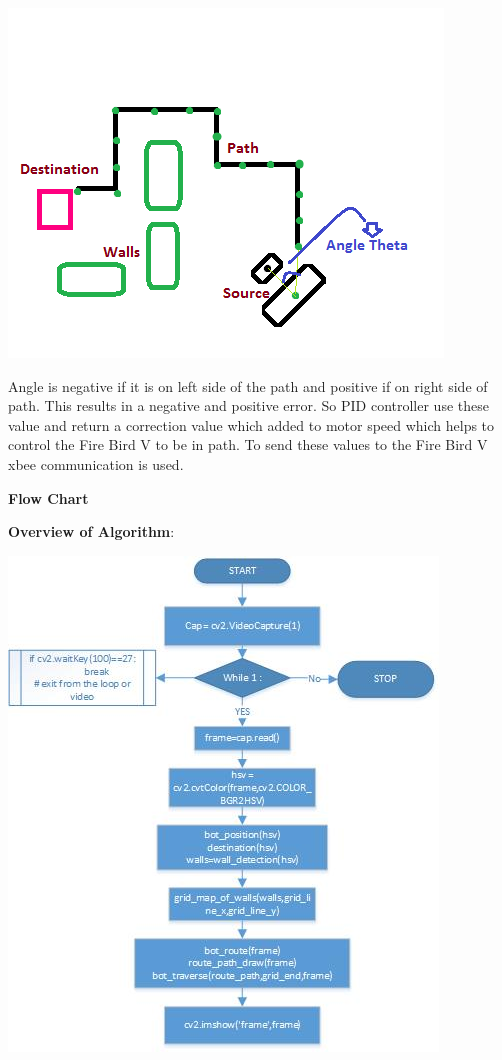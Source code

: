 \documentclass[report]{res}
\begin{document}
	\begin{center}
		\includegraphics[scale = 1.4]{graphics/pid_error.png}\\
	\end{center}
	
	Angle is negative if it is on left side of the path and positive if on right side of path. This results in a negative and positive error. So PID controller use these value and return a correction value which added to motor speed which helps to control the Fire Bird V to be in path. To send these values to the Fire Bird V xbee communication is used.
	
	\pagebreak
	
	
	\begin{center}
		\textbf{\huge Flow Chart} \\
	\end{center}
	
	\textbf{\Large Overview of Algorithm}:\\
	
	\begin{center}
		\includegraphics[scale = 1.2]{graphics/drawing1.jpg}\\
	\end{center}
	
\end{document}

